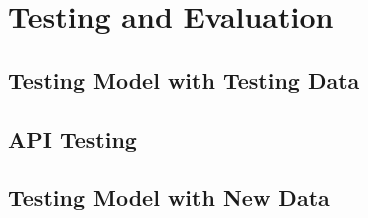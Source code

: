 \chapter{Testing and Evaluation}


\section{Testing Model with Testing Data}

\section{API Testing}

\section{Testing Model with New Data}